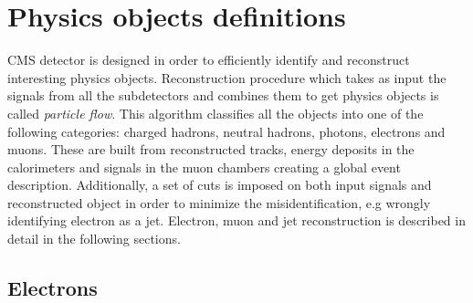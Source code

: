 \chapter{Physics objects definitions} %

\label{Chapter5} %


CMS detector is designed in order to efficiently identify and reconstruct interesting physics objects. Reconstruction procedure which takes as input the signals from all the subdetectors and combines them to get physics objects is called \textit{particle flow}. \cite{CMS:2009nxa} This algorithm classifies all the objects into one of the following categories: charged hadrons, neutral hadrons, photons, electrons and muons. These are built from reconstructed tracks, energy deposits in the calorimeters and signals in the muon chambers creating a global event description. Additionally, a set of cuts is imposed on both input signals and reconstructed object in order to minimize the misidentification, e.g wrongly identifying electron as a jet. Electron, muon and jet reconstruction is described in detail in the following sections. 


\section{Electrons}

